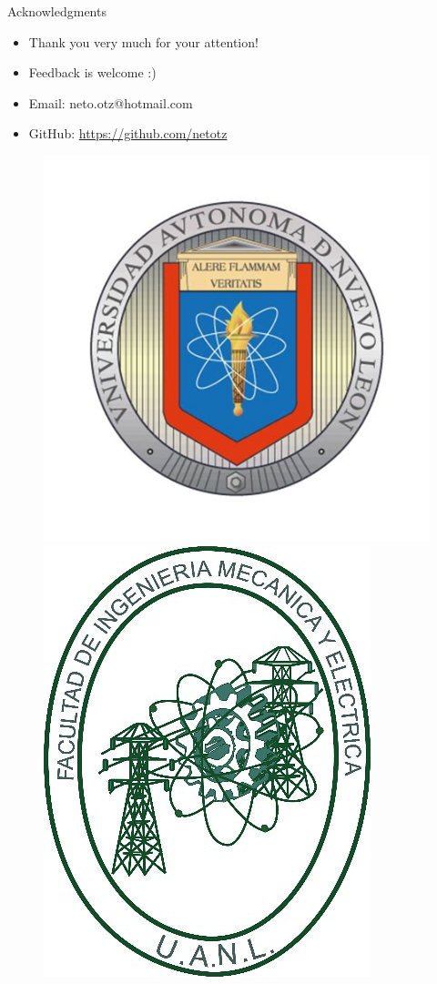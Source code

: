 \documentclass{beamer}
\begin{document}
\begin{frame}{Acknowledgments}
    \begin{itemize}
        \item Thank you very much for your attention!
        \item Feedback is welcome :)
        \item Email: neto.otz@hotmail.com
        \item GitHub: \url{https://github.com/netotz}
    \end{itemize}
    
    \begin{figure}
        \centering
        \includegraphics[scale=0.2]{uanl-logo}
        \includegraphics[scale=0.2]{fime-logo}
    \end{figure}
\end{frame}
\end{document}
